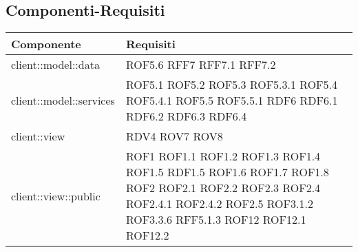\subsection{Componenti-Requisiti} %
\label{sub:componenti_requisiti}
\begin{center}
\def\arraystretch{1.5}
\bgroup
\begin{longtable}{| p{9cm} | p{4cm} |}
\hline
\textbf{Componente} & \textbf{Requisiti} \\
\hline
client::model::data  &  ROF5.6 \newline RFF7 \newline RFF7.1 \newline RFF7.2 \newline \\
\hline
client::model::services  &  ROF5.1 \newline ROF5.2 \newline ROF5.3 \newline ROF5.3.1  \newline ROF5.4 \newline ROF5.4.1 \newline ROF5.5 \newline ROF5.5.1 \newline RDF6 \newline RDF6.1 \newline RDF6.2 \newline RDF6.3 \newline RDF6.4 \newline \\
\hline
client::view  & RDV4 \newline ROV7 \newline ROV8 \\
\hline
client::view::public  &  ROF1 \newline ROF1.1 \newline ROF1.2 \newline ROF1.3 \newline ROF1.4 \newline ROF1.5 \newline RDF1.5 \newline ROF1.6 \newline ROF1.7 \newline ROF1.8 \newline ROF2 \newline ROF2.1 \newline ROF2.2 \newline ROF2.3 \newline ROF2.4 \newline ROF2.4.1 \newline ROF2.4.2 \newline ROF2.5 \newline ROF3.1.2 \newline ROF3.3.6 \newline RFF5.1.3 \newline ROF12 \newline ROF12.1 \newline ROF12.2 \newline \\

\end{longtable}
\end{center}
